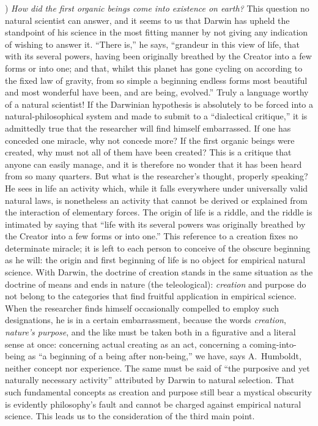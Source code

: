 \documentclass[12pt,a4paper]{article}
\begin{document}
\medskip

) \emph{How did the first organic beings come into existence on
earth?} This question no natural scientist can answer, and it seems to
us that Darwin has upheld the standpoint of his science in the most
fitting manner by not giving any indication of wishing to answer it.
``There is,'' he says, ``grandeur in this view of life, that with its
several powers, having been originally breathed by the Creator into a
few forms or into one; and that, whilst this planet has gone cycling
on according to the fixed law of gravity, from so simple a beginning
endless forms most beautiful and most wonderful have been, and are
being, evolved.''
Truly a language worthy of a natural scientist! If the Darwinian
hypothesis is absolutely to be forced into a natural-philosophical
system and made to submit to a ``dialectical critique,'' it is
admittedly true that the researcher will find himself embarrassed. If
one has conceded one miracle, why not concede more? If the first
organic beings were created, why must not all of them have been
created? This is a critique that anyone can easily manage, and it is
therefore no wonder that it has been heard from so many quarters. But
what is the researcher's thought, properly speaking? He sees in life
an activity which, while it falls everywhere under universally valid
natural laws, is nonetheless an activity that cannot be derived or
explained from the interaction of elementary forces. The origin of
life is a riddle, and the riddle is intimated by saying that ``life
with its several powers was originally breathed by the Creator into a
few forms or into one.'' This reference to a creation fixes no
determinate miracle; it is left to each person to conceive of the
obscure beginning as he will: the origin and first beginning of life
is no object for empirical natural science.
With Darwin, the doctrine of creation stands in the same situation as
the doctrine of means and ends in nature (the teleological): \emph{creation}
and purpose do not belong to the categories that find fruitful
application in empirical science. When the researcher finds himself
occasionally compelled to employ such designations, he is in a certain
embarrassment, because the words \emph{creation}, \emph{nature's
purpose}, and the like must be taken both in a figurative and a
literal sense at once: concerning actual creating as an
act, concerning a coming-into-being as ``a beginning of a being after
non-being,'' we have, says A.\ Humboldt, neither concept nor
experience. The same must be said of ``the purposive and yet
naturally necessary activity'' attributed by Darwin to natural
selection. That such fundamental concepts as creation and purpose
still bear a mystical obscurity is evidently philosophy's fault and
cannot be charged against empirical natural science. This leads us to
the consideration of the third main point.
\end{document}
